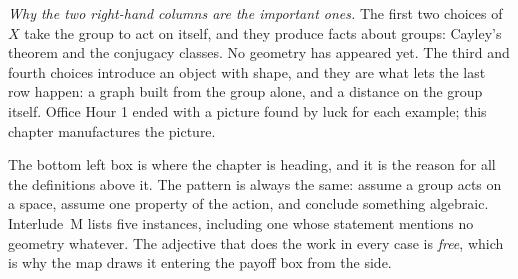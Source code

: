 \documentclass[10pt]{article}
\newcommand{\R}{\mathbb{R}}
\begin{document}
{\begin{minipage}[t]{744pt}
{}\par\vspace{4pt}
\begin{minipage}[t]{368pt}\vspace{0pt}
\begin{why}
\emph{Why the two right-hand columns are the important ones.} The first two choices of $X$ take the group to act on itself, and they produce facts about groups: Cayley's theorem and the conjugacy classes. No geometry has appeared yet. The third and fourth choices introduce an object with shape, and they are what lets the last row happen: a graph built from the group alone, and a distance on the group itself. Office Hour 1 ended with a picture found by luck for each example; this chapter manufactures the picture.
\end{why}
\end{minipage}\hfill
\begin{minipage}[t]{360pt}\vspace{0pt}
\begin{bigpic}
The bottom left box is where the chapter is heading, and it is the reason for all the definitions above it. The pattern is always the same: assume a group acts on a space, assume one property of the action, and conclude something algebraic. Interlude~M lists five instances, including one whose statement mentions no geometry whatever. The adjective that does the work in every case is \emph{free}, which is why the map draws it entering the payoff box from the side.
\end{bigpic}
\end{minipage}
\end{minipage}
}
\end{document}
